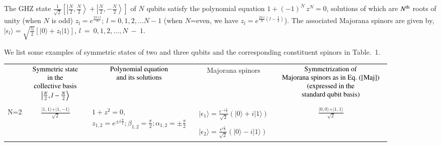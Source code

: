 {The   GHZ state $\frac{1}{\sqrt{2}}\left[\left\vert \frac{N}{2},\frac{N}{2}\right\rangle+ 
\left\vert \frac{N}{2},-\frac{N}{2}\right\rangle\right]$ of $N$ qubits  satisfy the polynomial equation 
$1 +(-1)^N\, z^{N}=0$, solutions of which are  $N^{\rm th}$ roots of unity (when $N$ is odd)
$z_{l}=e^{\frac{2\pi\, i\, l}{N}};\ l=0,1,2,\ldots N-1$ (when $N$=even, we have
$z_{l}=e^{\frac{2\pi\, i}{N}(l-\frac{1}{2})}$). The associated  Majorana spinors are given by,  
$\vert \epsilon_{l}\rangle=\sqrt{\frac{z_l}{2}}\left[ \vert 0\rangle + z_l \vert 1\rangle\right]$, $l~=~0,1,2,\ldots, N~-~1.$ 

We list some examples of   symmetric states of two and three qubits and the corresponding constituent spinors in Table.~1. 
\begin{table}
{\scriptsize\begin{tabular}{|c c|c|c|c|}
\hline
 & $\begin{array}{cc} {\rm Symmetric\ state} \\ {\rm in\ the} \\ {\rm collective\ basis}\\ \left\vert
\frac{N}{2},l-\frac{N}{2}\right\rangle \end{array}$ & $\begin{array}{c}{\rm Polynomial\ equation}\\ {\rm and \ its \  %
solutions}\end{array}$ & Majorana spinors 
 & $\begin{array}{c} {\rm Symmetrization\ of}\\ {\rm Majorana\ spinors\ as\ in\ Eq.~(\ref{Maj})} \\ 
 ({\rm expressed\ in\ the}\\ {\rm standard\ qubit\ basis})\end{array}$
 \\
& &  & & \\
\hline 
 N=2 & $\frac{\vert 1,1\rangle + \vert 1,-1\rangle}{\sqrt{2}}$
& $\begin{array}{c} 1+ z^2=0, \\ 
z_{1,2}=e^{\pm i\frac{\pi}{2}}; \beta_{1,2}=\frac{\pi}{2}; \alpha_{1,2}=\pm\frac{\pi}{2}\end{array}$
& $\begin{array}{c} \vert \epsilon_{1}\rangle=
  \frac{e^{-i\frac{\pi}{4}}}{\sqrt{2}}\left(\vert0\rangle+  i \vert 1\rangle\right) \\
  \\ \vert \epsilon_{2}\rangle=
  \frac{e^{i\frac{\pi}{4}}}{\sqrt{2}}\left(\vert0\rangle-  i \vert 1\rangle\right)\end{array}$ & $\frac{\vert 0,0\rangle + \vert 1,1\rangle}{\sqrt{2}}$ \\

\end{tabular}}
\end{table}}
